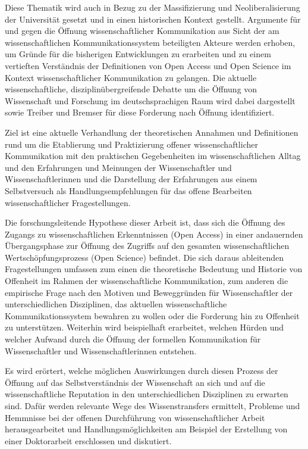 Diese Thematik wird auch in Bezug zu der Massifizierung und Neoliberalisierung der Universität  \cite{binswanger_2014_excellence} gesetzt und in einen historischen Kontext gestellt. Argumente für und gegen die Öffnung wissenschaftlicher Kommunikation aus Sicht der am wissenschaftlichen Kommunikationssystem beteiligten Akteure werden erhoben, um Gründe für die bisherigen Entwicklungen zu erarbeiten und zu einem vertieften Verständnis der Definitionen von Open Access und Open Science im Kontext wissenschaftlicher Kommunikation zu gelangen. Die aktuelle wissenschaftliche, disziplinübergreifende Debatte um die Öffnung von Wissenschaft und Forschung im deutschsprachigen Raum wird dabei dargestellt sowie Treiber und Bremser für diese Forderung nach Öffnung identifiziert.

Ziel ist eine aktuelle Verhandlung der theoretischen Annahmen und Definitionen rund um die Etablierung und Praktizierung offener wissenschaftlicher Kommunikation mit den praktischen Gegebenheiten im wissenschaftlichen Alltag und den Erfahrungen und Meinungen der Wissenschaftler und Wissenschaftlerinnen und die Darstellung der Erfahrungen aus einem Selbstversuch als Handlungsempfehlungen für das offene Bearbeiten wissenschaftlicher Fragestellungen.

Die forschungsleitende Hypothese dieser Arbeit ist, dass sich die Öffnung des Zugangs zu wissenschaftlichen Erkenntnissen (Open Access) in einer andauernden Übergangsphase zur Öffnung des Zugriffs auf den gesamten wissenschaftlichen Wertschöpfungsprozess (Open Science) befindet. Die sich daraus ableitenden Fragestellungen umfassen zum einen die theoretische Bedeutung und Historie von Offenheit im Rahmen der wissenschaftliche Kommunikation, zum anderen die empirische Frage nach den Motiven und Beweggründen für Wissenschaftler der unterschiedlichen Disziplinen, das aktuellen wissenschaftliche Kommunikationssystem bewahren zu wollen oder die Forderung hin zu Offenheit zu unterstützen. Weiterhin wird beispielhaft erarbeitet, welchen Hürden und welcher Aufwand durch die Öffnung der formellen Kommunikation für Wissenschaftler und Wissenschaftlerinnen entstehen.

Es wird erörtert, welche möglichen Auswirkungen durch diesen Prozess der Öffnung auf das Selbstverständnis der Wissenschaft an sich und auf die wissenschaftliche Reputation in den unterschiedlichen Disziplinen zu erwarten sind. Dafür werden relevante Wege des Wissenstransfers ermittelt, Probleme und Hemmnisse bei der offenen Durchführung von wissenschaftlicher Arbeit herausgearbeitet und Handlungsmöglichkeiten am Beispiel der Erstellung von einer Doktorarbeit erschlossen und diskutiert.

